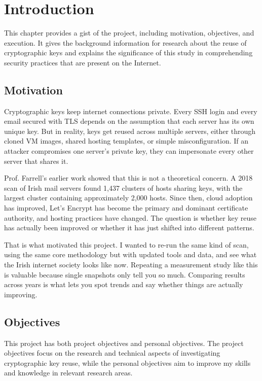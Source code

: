 \chapter{Introduction}

This chapter provides a gist of the project, including motivation, objectives, and execution. It gives the background information for research about the reuse of cryptographic keys and explains the significance of this study in comprehending security practices that are present on the Internet.

\section{Motivation}

Cryptographic keys keep internet connections private. Every SSH login and every email secured with TLS depends on the assumption that each server has its own unique key. But in reality, keys get reused across multiple servers, either through cloned VM images, shared hosting templates, or simple misconfiguration. If an attacker compromises one server's private key, they can impersonate every other server that shares it.

Prof. Farrell's earlier work \cite{cryptoeprint:2018/299} showed that this is not a theoretical concern. A 2018 scan of Irish mail servers found 1,437 clusters of hosts sharing keys, with the largest cluster containing approximately 2,000 hosts. Since then, cloud adoption has improved, Let's Encrypt has become the primary and dominant certificate authority, and hosting practices have changed. The question is whether key reuse has actually been improved or whether it has just shifted into different patterns.

That is what motivated this project. I wanted to re-run the same kind of scan, using the same core methodology but with updated tools and data, and see what the Irish internet society looks like now. Repeating a measurement study like this is valuable because single snapshots only tell you so much. Comparing results across years is what lets you spot trends and say whether things are actually improving.

\section{Objectives}

This project has both project objectives and personal objectives. The project objectives focus on the research and technical aspects of investigating cryptographic key reuse, while the personal objectives aim to improve my skills and knowledge in relevant research areas.

